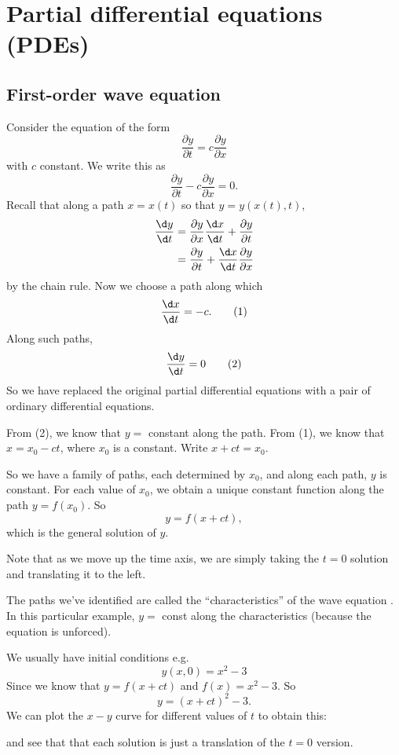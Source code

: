 \documentclass[a4paper]{article}
\begin{document}
\section{Partial differential equations (PDEs)}
\subsection{First-order wave equation}
Consider the equation of the form
\[
\frac{\partial y}{\partial t} = c\frac{\partial y}{\partial x}
\]
with $c$ constant. We write this as
\[
\frac{\partial y}{\partial t} - c\frac{\partial y}{\partial x} = 0.
\]
Recall that along a path $x = x(t)$ so that $y = y(x(t), t)$,
\begin{align*}
  \frac{\d y}{\d t} &= \frac{\partial y}{\partial x}\frac{\d x}{\d t} + \frac{\partial y}{\partial t}\\
  &= \frac{\partial y}{\partial t} + \frac{\d x}{\d t}\frac{\partial y}{\partial x}
\end{align*}
by the chain rule. Now we choose a path along which
\[
\frac{\d x}{\d t} = -c. \tag{1}
\] Along such paths,
\[
\frac{\d y}{\d t} = 0 \tag{2}
\]
So we have replaced the original partial differential equations with a pair of ordinary differential equations.

From (2), we know that $y = $ constant along the path. From (1), we know that $x = x_0 - ct$, where $x_0$ is a constant. Write $x + ct = x_0$.

So we have a family of paths, each determined by $x_0$, and along each path, $y$ is constant. For each value of $x_0$, we obtain a unique constant function along the path $y = f(x_0)$. So
\[
y = f(x + ct),
\]
which is the general solution of $y$.


Note that as we move up the time axis, we are simply taking the $t = 0$ solution and translating it to the left.

The paths we've identified are called the ``characteristics'' of the wave equation . In this particular example, $y =$ const along the characteristics (because the equation is unforced).

We usually have initial conditions e.g.
\[
y(x, 0) = x^2 - 3
\]
Since we know that $y = f(x + ct)$ and $f(x) = x^2 - 3$. So
\[
y = (x + ct)^2 - 3.
\]
We can plot the $x-y$ curve for different values of $t$ to obtain this:


and see that that each solution is just a translation of the $t = 0$ version.
\end{document}
